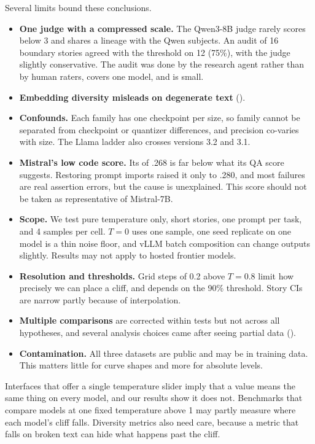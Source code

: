 Several limits bound these conclusions.
\begin{itemize}[leftmargin=*,itemsep=0pt,topsep=0pt]
    \item {\bf One judge with a compressed scale.} The Qwen3-8B judge rarely scores below 3 and shares a lineage with the Qwen subjects. An audit of 16 boundary stories agreed with the threshold on 12 (75\%), with the judge slightly conservative. The audit was done by the research agent rather than by human raters, covers one model, and is small.
    \item {\bf Embedding diversity misleads on degenerate text} ().
    \item {\bf Confounds.} Each family has one checkpoint per size, so family cannot be separated from checkpoint or quantizer differences, and precision co-varies with size. The Llama ladder also crosses versions 3.2 and 3.1.
    \item {\bf Mistral's low code score.} Its \passone of .268 is far below what its QA score suggests. Restoring prompt imports raised it only to .280, and most failures are real assertion errors, but the cause is unexplained. This score should not be taken as representative of Mistral-7B.
    \item {\bf Scope.} We test pure temperature only, short stories, one prompt per task, and 4 samples per cell. $T = 0$ uses one sample, one seed replicate on one model is a thin noise floor, and vLLM batch composition can change outputs slightly. Results may not apply to hosted frontier models.
    \item {\bf Resolution and thresholds.} Grid steps of 0.2 above $T = 0.8$ limit how precisely we can place a cliff, and \Tu depends on the 90\% threshold. Story \Tu CIs are narrow partly because of interpolation.
    \item {\bf Multiple comparisons} are corrected within tests but not across all hypotheses, and several analysis choices came after seeing partial data ().
    \item {\bf Contamination.} All three datasets are public and may be in training data. This matters little for curve shapes and more for absolute levels.
\end{itemize}

Interfaces that offer a single temperature slider imply that a value means the same thing on every model, and our results show it does not. Benchmarks that compare models at one fixed temperature above 1 may partly measure where each model's cliff falls. Diversity metrics also need care, because a metric that falls on broken text can hide what happens past the cliff.
